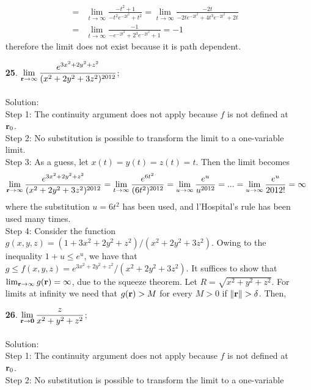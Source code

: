 \documentclass[12pt]{amsbook}
\begin{document}
\begin{enumerate}
\begin{eqnarray*}
&=&\lim_{t \rightarrow \infty} \frac{-t^2+1}{-t^2e^{-2t^2}+t^2}=\lim_{t \rightarrow \infty} \frac{-2t}{-2te^{-2t^2}+4t^3e^{-2t^2}+2t} \\
&=&\lim_{t \rightarrow \infty} \frac{-1}{-e^{-2t^2}+2^3e^{-2t^2}+1}=-1
\end{eqnarray*}
therefore the limit does not exist because it is path dependent.
\\
\item[{\small\bf 25}.] $\! \begin{aligned}[t]
\lim_{{\bf r} \rightarrow \infty}\frac{e^{3x^2+2y^2+z^2}}{(x^2+2y^2+3z^2)^{2012}}
 \end{aligned}$;
\\
\\
{\sc Solution}:
\\
{\sf Step 1}: The continuity argument does not apply because $f$ is not defined at ${\bf r}_0$.
\\
{\sf Step 2}: No substitution is possible to transform the limit to a one-variable
limit.
\\
{\sf Step 3}: As a guess, let $x(t)=y(t)=z(t)=t$. Then the limit becomes
$$\lim_{{\bf r} \rightarrow \infty}\frac{e^{3x^2+2y^2+z^2}}{(x^2+2y^2+3z^2)^{2012}}=\lim_{t\rightarrow \infty}\frac{e^{6t^2}}{(6t^2)^{2012}}=\lim_{u\rightarrow \infty}\frac{e^{u}}{u^{2012}}=...=\lim_{u\rightarrow \infty}\frac{e^{u}}{2012!}=\infty$$
where the substitution $u=6t^2$ has been used, and l'Hospital's rule has been used many times.
\\
{\sf Step 4}: Consider the function $g(x,y,z)=(1+3x^2+2y^2+z^2)/(x^2+2y^2+3z^2)$. Owing to the inequality $1+u \leq e^u$, we have that $g \leq f(x,y,z)=e^{3x^2+2y^2+z^2}/(x^2+2y^2+3z^2)$. It suffices to show that $\lim_{{\bf r} \rightarrow \infty}g({\bf r})=\infty$, due to the squeeze theorem. Let $R=\sqrt{x^2+y^2+z^2}$. For limits at infinity we need that $g({\bf r})>M$ for every $M>0$ if $\|{\bf r}\|>\delta$. Then,
\\
\item[{\small\bf 26}.] $\! \begin{aligned}[t]
\lim_{{\bf r} \rightarrow {\bf 0}} \frac{z}{x^2+y^2+z^2}
 \end{aligned}$;
\\
\\
{\sc Solution}:
\\
{\sf Step 1}: The continuity argument does not apply because $f$ is not defined at ${\bf r}_0$.
\\
{\sf Step 2}: No substitution is possible to transform the limit to a one-variable

\end{enumerate}
\end{document}
